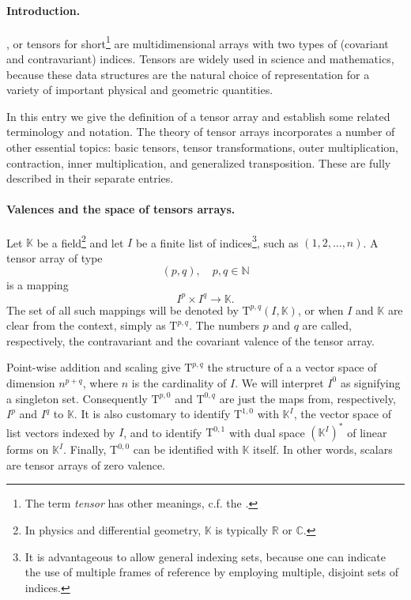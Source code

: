 \documentclass[12pt]{article}
\newcommand{\reals}{\mathbb{R}}
\newcommand{\natnums}{\mathbb{N}}
\newcommand{\cnums}{\mathbb{C}}
\newcommand{\lp}{\left(}
\newcommand{\rp}{\right)}
\newcommand{\kfield}{\mathbb{K}}
\newcommand{\rT}{\mathrm{T}}
\newcommand{\tspace}[1]{\rT^{#1}}
\begin{document}
\paragraph{Introduction.}
, or tensors for short\footnote{The term {\em tensor} has other meanings, c.f. the .}
are multidimensional arrays with two types of (covariant and
contravariant) indices.  Tensors are widely used in science and
mathematics, because these data structures are the natural choice of
representation for a variety of important physical and geometric
quantities.
  
In this entry we give the definition of a tensor array and establish
some related terminology and notation.  The theory of tensor arrays
incorporates a number of other essential topics: basic tensors, tensor
transformations, outer multiplication, contraction, inner
multiplication, and generalized transposition.  These are fully
described in their separate entries.

\paragraph{Valences and the space of tensors arrays.}
Let $\kfield$ be a field\footnote{In physics and differential
  geometry, $\kfield$ is typically $\reals$ or $\cnums$.} and let $I$
be a finite list of indices\footnote{It is advantageous to allow
  general indexing sets, because one can indicate the use of multiple
  frames of reference by employing multiple, disjoint sets of
  indices.}, such as $(1,2,\ldots, n)$.  A tensor array of type
$$(p,q),\quad p,q\in\natnums$$
is a mapping 
$$I^p\times I^q\rightarrow \kfield.$$
The set of all such mappings
will be denoted by $\tspace{p,q}(I,\kfield)$, or when $I$ and
$\kfield$ are clear from the context, simply as $\tspace{p,q}$.  The
numbers $p$ and $q$ are called, respectively, the contravariant and
the covariant valence of the tensor array.

Point-wise addition and scaling give $\tspace{p,q}$ the structure of a
a vector space of dimension $n^{p+q}$, where $n$ is the cardinality of
$I$.  We will interpret $I^0$ as signifying a singleton set.
Consequently $\tspace{p,0}$ and $\tspace{0,q}$ are just the maps from,
respectively, $I^p$ and $I^q$ to $\kfield$.  It is also customary to
identify $\tspace{1,0}$ with $\kfield^I$, the vector space of list
vectors indexed by $I$, and to identify $\tspace{0,1}$ with dual space
$\lp\kfield^I\rp^*$ of linear forms on $\kfield^I$.  Finally,
$\tspace{0,0}$ can be identified with $\kfield$ itself. In other
words, scalars are tensor arrays of zero valence.
\end{document}
